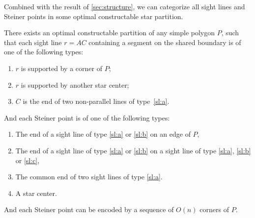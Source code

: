 \documentclass{theoretics}
\begin{document}
Combined with the result of \cref{sec:structure}, we can categorize all sight lines and Steiner points in some optimal constructable star partition. 
\begin{lemma}
    There exists an optimal constructable partition of any simple polygon $P$, such that each sight line $r = AC$ containing a segment on the shared boundary is of one of the following types: 
    \begin{enumerate}[label=(\alph*)]
        \item $r$ is supported by a corner of $P$; \label{sl:a}
        \item $r$ is supported by another star center; \label{sl:b}
        \item $C$ is the end of two non-parallel lines of type~\ref{sl:a}. \label{sl:c}
    \end{enumerate}
    
    And each Steiner point is of one of the following types:
    \begin{enumerate}[label=(\alph*)]
        \item The end of a sight line of type \ref{sl:a} or \ref{sl:b} on an edge of $P$, \label{st:a}
        \item The end of a sight line of type \ref{sl:a} or \ref{sl:b} on a sight line of type \ref{sl:a}, \ref{sl:b} or \ref{sl:c}, \label{st:b}
        \item The common end of two sight lines of type \ref{sl:a}. \label{st:c}
        \item
        A star center. \label{st:d}
    \end{enumerate}
    And each Steiner point can be encoded by a sequence of $O(n)$ corners of $P$. 
\end{lemma}
\end{document}
